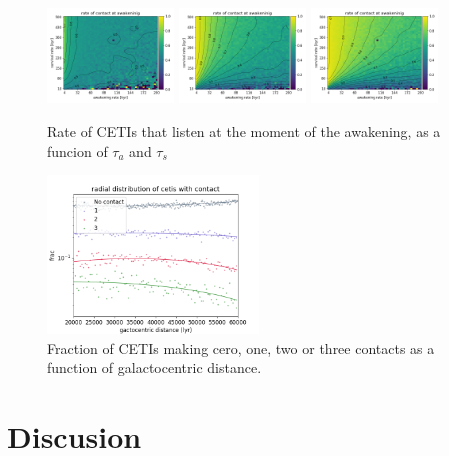 \documentclass[crop]{CSLB}%
\begin{document}
  
\begin{figure} %
   \centering
   \includegraphics[width=0.3\textwidth]{m2d2.png}%
   \includegraphics[width=0.3\textwidth]{m2d3.png}%
   \includegraphics[width=0.3\textwidth]{m2d4.png}
   \caption{Rate of CETIs that listen at the moment of the
   awakening, as a funcion of $\tau_a$ and $\tau_s$}
   \label{F_res_4}
\end{figure}



\begin{figure}
   \centering
   \includegraphics[width=0.5\textwidth]{radial.png}
   \caption{Fraction of CETIs making cero, one, two or three contacts as a function of
   galactocentric distance.}
   \label{F_res_5}
\end{figure}
           
 

\section{Discusion}\label{S_discussion}
\end{document}
